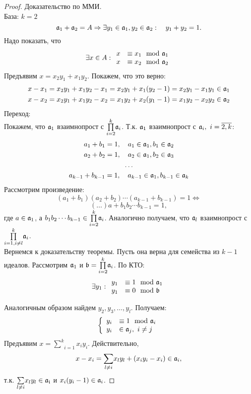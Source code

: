 \begin{proof}
Доказательство по ММИ.\\
База: $k = 2$
\[\mathfrak{a}_1 + \mathfrak{a}_2 = A \Rightarrow \exists y_1 \in \mathfrak{a}_1, y_2 \in \mathfrak{a}_2:~~~y_1 + y_2 = 1.\]
Надо показать, что
\[\exists x \in A: \begin{array}{l l}
                   x & \equiv x_1 \mod \Id{a}_1 \\
                   x & \equiv x_2 \mod \Id{a}_2 \\
                   \end{array}
\]
Предъявим $x = x_2y_1 + x_1y_2$. Покажем, что это верно:
\begin{gather}
x - x_1 = x_2y_1 + x_1y_2 - x_1 = x_2y_1 + x_1(y_2 - 1) = x_2y_1 - x_1y_1 \in \mathfrak{a}_1 \notag \\
x - x_2 = x_2y_1 + x_1y_2 - x_2 = x_1y_2 + x_2(y_1 - 1) = x_1y_2 - x_2y_2 \in \mathfrak{a}_2 \notag
\end{gather}
Переход:\\
Покажем, что $\mathfrak{a}_1$ взаимнопрост с $\underset{i = 2}{\overset{k}\prod}\mathfrak{a}_i$. Т.к. $\mathfrak{a}_1$ взаимнопрост с
$\mathfrak{a}_i,~i=\overline{2,k}$:
\begin{gather}
a_1 + b_1 = 1, ~~~a_1 \in \mathfrak{a}_1, b_1 \in \mathfrak{a}_2 \notag \\
a_2 + b_2 = 1, ~~~a_2 \in \mathfrak{a}_1, b_2 \in \mathfrak{a}_3 \notag \\
\dots \notag \\
a_{k-1} + b_{k-1} = 1, ~~~a_{k-1} \in \mathfrak{a}_1, b_{k-1} \in \mathfrak{a}_k \notag
\end{gather}
Рассмотрим произведение:
\[(a_1 + b_1)(a_2 + b_2)\cdots(a_{k-1} + b_{k-1}) = 1 \Leftrightarrow\] 
\[(\dots)a + b_1b_2 \cdots b_{k-1} = 1,\]
где $a \in \mathfrak{a}_1$, а $b_1b_2 \cdots b_{k-1} \in \underset{i = 2}{\overset{k}\prod}\mathfrak{a}_i$.
Аналогично получаем, что $\mathfrak{a}_l$ взаимнопрост с $\underset{i = 1, i \neq l}{\overset{k}\prod}\mathfrak{a}_i$.\\
Вернемся к доказательству теоремы. Пусть она верна для семейства из $k - 1$ идеалов.
Рассмотрим $\mathfrak{a}_1$ и $\mathfrak{b} = \underset{i = 2}{\overset{k}\prod}\mathfrak{a}_i$. По КТО:
\[
\exists y_1: \begin{array}{l l}
              y_1 & \equiv 1 \mod \Id{a}_1 \\
              y_1 & \equiv 0 \mod \Id{b} \\
             \end{array}
\]

Аналогичным образом найдем $y_2, y_3, \dots, y_l$. Получаем:
\[
\left\{ 
\begin{array}{l l}
  y_i & \equiv 1 \mod \Id{a}_i \\
  y_i & \in \Id{a}_j, ~i \neq j\\
\end{array} \right.
\]
Предъявим $x = \underset{i = 1}{\overset{k}\sum}x_iy_i$. Действительно,
\[x - x_i = \underset{l \neq i}\sum x_ly_l + (x_iy_i - x_i) \in \mathfrak{a}_i,\]
т.к. $\underset{l \neq i}\sum x_ly_l \in \mathfrak{a_i}$ и $x_i(y_i - 1) \in \mathfrak{a}_i$.


\end{proof}
